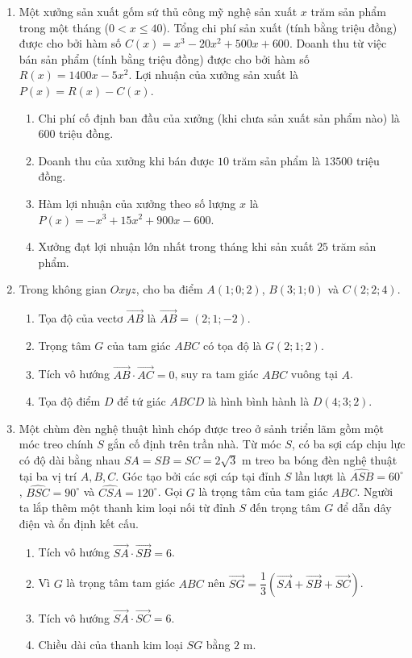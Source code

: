 \documentclass[12pt,a4paper]{article}
\begin{document}
\newpage
\begin{enumerate}[start=2]
\item Một xưởng sản xuất gốm sứ thủ công mỹ nghệ sản xuất $x$ trăm sản phẩm trong một tháng ($0 < x \le 40$). Tổng chi phí sản xuất (tính bằng triệu đồng) được cho bởi hàm số $C(x)=x^3-20x^2+500x+600$. Doanh thu từ việc bán sản phẩm (tính bằng triệu đồng) được cho bởi hàm số $R(x)=1400x-5x^2$. Lợi nhuận của xưởng sản xuất là $P(x)=R(x)-C(x)$.
\begin{enumerate}
\item Chi phí cố định ban đầu của xưởng (khi chưa sản xuất sản phẩm nào) là $600$ triệu đồng.
\item Doanh thu của xưởng khi bán được $10$ trăm sản phẩm là $13500$ triệu đồng.
\item Hàm lợi nhuận của xưởng theo số lượng $x$ là $P(x)=-x^3+15x^2+900x-600$.
\item Xưởng đạt lợi nhuận lớn nhất trong tháng khi sản xuất $25$ trăm sản phẩm.
\end{enumerate}

\item Trong không gian $Oxyz$, cho ba điểm $A(1;0;2)$, $B(3;1;0)$ và $C(2;2;4)$.
\begin{enumerate}
\item Tọa độ của vectơ $\vec{AB}$ là $\vec{AB}=(2;1;-2)$.
\item Trọng tâm $G$ của tam giác $ABC$ có tọa độ là $G(2;1;2)$.
\item Tích vô hướng $\vec{AB}\cdot\vec{AC}=0$, suy ra tam giác $ABC$ vuông tại $A$.
\item Tọa độ điểm $D$ để tứ giác $ABCD$ là hình bình hành là $D(4;3;2)$.
\end{enumerate}

\item Một chùm đèn nghệ thuật hình chóp được treo ở sảnh triển lãm gồm một móc treo chính $S$ gắn cố định trên trần nhà. Từ móc $S$, có ba sợi cáp chịu lực có độ dài bằng nhau $SA=SB=SC=2\sqrt{3}\text{ m}$ treo ba bóng đèn nghệ thuật tại ba vị trí $A, B, C$. Góc tạo bởi các sợi cáp tại đỉnh $S$ lần lượt là $\widehat{ASB}=60^\circ$, $\widehat{BSC}=90^\circ$ và $\widehat{CSA}=120^\circ$. Gọi $G$ là trọng tâm của tam giác $ABC$. Người ta lắp thêm một thanh kim loại nối từ đỉnh $S$ đến trọng tâm $G$ để dẫn dây điện và ổn định kết cấu.
\begin{enumerate}
\item Tích vô hướng $\vec{SA}\cdot\vec{SB}=6$.
\item Vì $G$ là trọng tâm tam giác $ABC$ nên $\vec{SG}=\dfrac{1}{3}(\vec{SA}+\vec{SB}+\vec{SC})$.
\item Tích vô hướng $\vec{SA}\cdot\vec{SC}=6$.
\item Chiều dài của thanh kim loại $SG$ bằng $2\text{ m}$.
\end{enumerate}
\end{enumerate}
\end{document}
